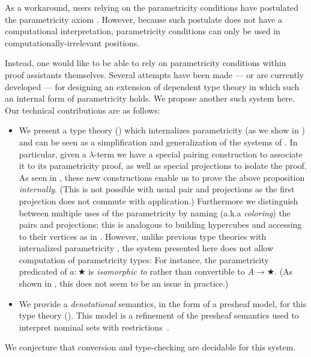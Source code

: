 \documentclass[english]{PaperTools/latex/lipics}
\begin{document}
As a workaround, users relying on the parametricity conditions have
postulated the parametricity axiom
\citep{pouillard_nameless_2011,chlipala_parametric_2008,atkey_unembedding_2009}.
However, %
because such postulate does not have a computational interpretation,
parametricity conditions can only be used in computationally-irrelevant
positions.

Instead, one would like to be able to rely on parametricity conditions
within proof assistants themselves.  Several attempts have been made
\citep{bernardy_computational_2012,bernardy_type-theory_2013} --- or are currently
developed \citep{altenkirch2014syntax} ---
for designing an extension of dependent type theory in which such an internal form of
parametricity holds. We propose another such system here.
Our technical contributions are as follows:
\begin{itemize}
\item We present a type theory () which internalizes parametricity (as we show in )
  and can be seen as a simplification and generalization of the systems of
  \cite{bernardy_computational_2012,bernardy_type-theory_2013}.
  In particular, given a $λ$-term we have a special pairing construction
  to associate it to its parametricity proof, as well as special
  projections to isolate the proof. As seen in , these
  new constructions enable us to prove the above proposition
  \emph{internally}.  (This is not possible with usual pair and
  projections as the first projection does not commute with
  application.)  Furthermore we distinguish between multiple uses of the
  parametricity by naming (a.k.a \emph{coloring}) the pairs and
  projections; this is analogous to building hypercubes and accessing to
  their vertices as in \citep{bernardy_computational_2012}.
  However, unlike previous type theories with internalized parametricity
  \citep{bernardy_computational_2012, bernardy_type-theory_2013}, the
  system presented here does not allow computation of parametricity types:
  For instance, the parametricity predicated of $a : ★$ is
  \emph{isomorphic to} rather than convertible to $A → ★$.  (As shown in
  , this does not seem to be an issue in
  practice.)
\item We provide a \emph{denotational} semantics, in the form of a presheaf model, for this type theory ().
      This model is a refinement of the presheaf semantics used to
      interpret nominal sets with
      restrictions~\citep{bezem2014model,DBLP:journals/corr/Pitts14}.
\end{itemize}
We conjecture that conversion and type-checking are decidable for this system.
\end{document}
